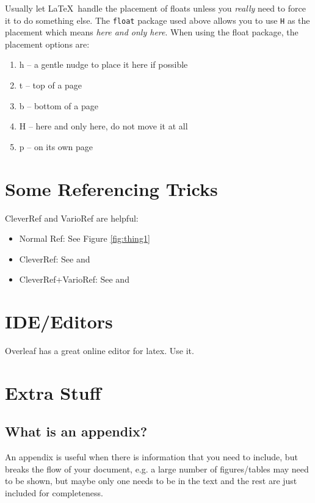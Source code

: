 \documentclass[a4paper,twoside,12pt]{report}
\begin{document}
Usually let \LaTeX\ handle the placement of floats unless you \textit{really} need to force it to do something else. The \texttt{float} package used above allows you to use \texttt{H} as the placement which means \textit{here and only here}. When using the float package, the placement options are:
\begin{enumerate}
\item h -- a gentle nudge to place it here if possible
\item t -- top of a page
\item b -- bottom of a page
\item H -- here and only here, do not move it at all
\item p -- on its own page
\end{enumerate}


\chapter{Some Referencing Tricks}
CleverRef and VarioRef are helpful:
\begin{itemize}
	\item Normal Ref: See Figure \ref{fig:thing1}
	\item CleverRef: See  and 
	\item CleverRef+VarioRef: See  and 
\end{itemize}

\chapter{IDE/Editors}
Overleaf has a great online editor for latex. Use it. 

\appendix
\chapter{Extra Stuff}\label{app:extra}
\section{What is an appendix?}\label{app:whatis}

An appendix is useful when there is information that you need to include, but breaks the flow of your document, e.g. a large number of figures/tables may need to be shown, but maybe only one needs to be in the text and the rest are just included for completeness.

\nocite{*}

\end{document}
